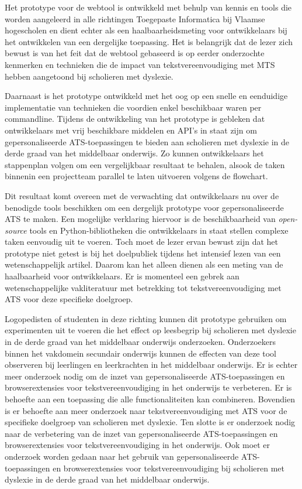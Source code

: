 \medspace

Het prototype voor de webtool is ontwikkeld met behulp van kennis en tools die worden aangeleerd in alle richtingen Toegepaste Informatica bij Vlaamse hogescholen en dient echter als een haalbaarheidsmeting voor ontwikkelaars bij het ontwikkelen van een dergelijke toepassing. Het is belangrijk dat de lezer zich bewust is van het feit dat de webtool gebaseerd is op eerder onderzochte kenmerken en technieken die de impact van tekstvereenvoudiging met MTS hebben aangetoond bij scholieren met dyslexie.

Daarnaast is het prototype ontwikkeld met het oog op een snelle en eenduidige implementatie van technieken die voordien enkel beschikbaar waren per commandline. Tijdens de ontwikkeling van het prototype is gebleken dat ontwikkelaars met vrij beschikbare middelen en API's in staat zijn om gepersonaliseerde ATS-toepassingen te bieden aan scholieren met dyslexie in de derde graad van het middelbaar onderwijs. Zo kunnen ontwikkelaars het stappenplan volgen om een vergelijkbaar resultaat te behalen, alsook de taken binnenin een projectteam parallel te laten uitvoeren volgens de flowchart.

Dit resultaat komt overeen met de verwachting dat ontwikkelaars nu over de benodigde tools beschikken om een dergelijk prototype voor gepersonaliseerde ATS te maken. Een mogelijke verklaring hiervoor is de beschikbaarheid van \textit{open-source} tools en Python-bibliotheken die ontwikkelaars in staat stellen complexe taken eenvoudig uit te voeren. Toch moet de lezer ervan bewust zijn dat het prototype niet getest is bij het doelpubliek tijdens het intensief lezen van een wetenschappelijk artikel. Daarom kan het alleen dienen als een meting van de haalbaarheid voor ontwikkelaars. Er is momenteel een gebrek aan wetenschappelijke vakliteratuur met betrekking tot tekstvereenvoudiging met ATS voor deze specifieke doelgroep.

Logopedisten of studenten in deze richting kunnen dit prototype gebruiken om experimenten uit te voeren die het effect op leesbegrip bij scholieren met dyslexie in de derde graad van het middelbaar onderwijs onderzoeken. Onderzoekers binnen het vakdomein secundair onderwijs kunnen de effecten van deze tool observeren bij leerlingen en leerkrachten in het middelbaar onderwijs. Er is echter meer onderzoek nodig om de inzet van gepersonaliseerde ATS-toepassingen en browserextensies voor tekstvereenvoudiging in het onderwijs te verbeteren. Er is behoefte aan een toepassing die alle functionaliteiten kan combineren. Bovendien is er behoefte aan meer onderzoek naar tekstvereenvoudiging met ATS voor de specifieke doelgroep van scholieren met dyslexie. Ten slotte is er onderzoek nodig naar de verbetering van de inzet van gepersonaliseerde ATS-toepassingen en browserextensies voor tekstvereenvoudiging in het onderwijs. Ook moet er onderzoek worden gedaan naar het gebruik van gepersonaliseerde ATS-toepassingen en browserextensies voor tekstvereenvoudiging bij scholieren met dyslexie in de derde graad van het middelbaar onderwijs.